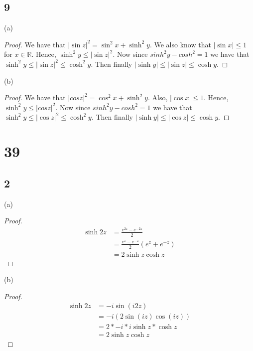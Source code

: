 \documentclass{article}
\newcommand{\R}{\mathbb{R}}
\begin{document}
\subsection*{9} %
(a)
\begin{proof}
    We have that $|\sin z|^2 = \sin^2 x + \sinh^2 y$. We also know that $|\sin x| \leq 1$
    for $x \in \R$. Hence, $\sinh^2 y \leq |\sin z|^2$. Now since $sinh^2 y - cosh^2 = 1$
    we have that $\sinh^2 y \leq |\sin z|^2 \leq \cosh^2 y$.
    Then finally $|\sinh y| \leq |\sin z| \leq \cosh y$.
\end{proof}
(b)
\begin{proof}
    We have that $|cos z|^2 = \cos^2 x + \sinh^2 y$. Also, $|\cos x| \leq 1$.
    Hence, $\sinh^2 y \leq |cos z|^2$. Now since $sinh^2 y - cosh^2 = 1$ we
    have that $\sinh^2 y \leq |\cos z|^2 \leq \cosh^2 y$.
    Then finally $|\sinh y| \leq |\cos z| \leq \cosh y$.
\end{proof}
\section*{39}
\subsection*{2} %
(a) \begin{proof}
    \begin{align*}
        \sinh 2z & = \frac{e^{2z} - e^{-2z}}{2}         \\
                 & = \frac{e^z-e^{-z}}{2}(e^z + e^{-z}) \\
                 & = 2\sinh z \cosh z
    \end{align*}
\end{proof}
(b)
\begin{proof}
    \begin{align*}
        \sinh 2z & = -i\sin (i2z)            \\
                 & = -i(2\sin (iz)\cos(iz))  \\
                 & = 2*-i*i\sinh z * \cosh z \\
                 & = 2\sinh z \cosh z
    \end{align*}
\end{proof}
\end{document}
